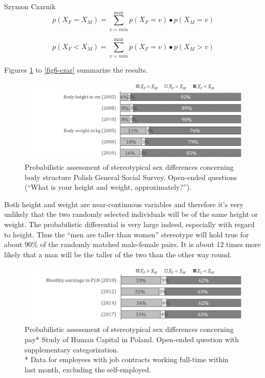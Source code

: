 \begin{artengenv}{Szymon Czarnik}
\[p\left( X_{F} = X_{M} \right) = \sum_{v = min}^{\max}{p\left( X_{F} = v \right) \bullet p\left( X_{M} = v \right)}\]

\[p\left( X_{F} < X_{M} \right) = \sum_{v = min}^{\max}{p\left( X_{F} = v \right) \bullet p\left( X_{M} > v \right)}\]

Figures \ref{fig3-czar} to \ref{fig6-czar} summarize the results.

\begin{figure}[H]
	\centering
   \includegraphics[width=\textwidth]{ART_Czarnik/Czarnik-img019.jpg}
\caption{Probabilistic assessment of stereotypical sex differences concerning body structure Polish General Social Survey. Open-ended questions (``What is your height and weight, approximately?'').}\label{fig3-czar}
\end{figure}


Both height and weight are near-continuous variables and therefore it's very unlikely that the two randomly selected individuals will be of the same height or weight. The probabilistic differential is very large indeed, especially with regard to height. Thus the ``men are taller than women'' stereotype will hold true for about 90\% of the randomly matched male-female pairs. It is about 12 times more likely that a man will be the taller of the two than the other way round.

\begin{figure}[H]
	\centering
   \includegraphics[width=\textwidth]{ART_Czarnik/Czarnik-img020.jpg}
\caption{Probabilistic assessment of stereotypical sex differences concerning pay* Study of Human Capital in Poland. Open-ended question with supplementary categorization. \\ * Data for employees with job contracts working full-time within last month, excluding the self-employed.}\label{fig4-czar}
\end{figure}


\end{artengenv}
